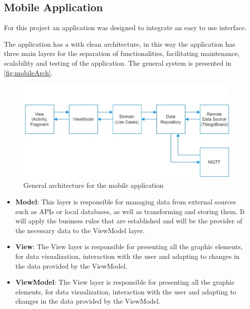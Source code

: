 \clearpage
\subsection{Mobile Application}

For this project an application was designed to integrate an easy to use interface.

The application has a  with clean architecture, in this way the application has three main layers for the separation of functionalities, facilitating maintenance, scalability and testing of the application. The general system is presented in \autoref{fig:mobileArch}.

\begin{figure}[H]
    \centering
    \includegraphics[width=1\textwidth]{./images/8/Diagrama.jpg}
    \caption{General architecture for the mobile application}
    \label{fig:mobileArch}
\end{figure}

\begin{itemize}
    \item \textbf{Model}: This layer is responsible for managing data from external sources such as APIs or local databases, as well as transforming and storing them. It will apply the business rules that are established and will be the provider of the necessary data to the ViewModel layer.
    \item \textbf{View}: The View layer is responsible for presenting all the graphic elements, for data visualization, interaction with the user and adapting to changes in the data provided by the ViewModel. 
    \item \textbf{ViewModel}: The View layer is responsible for presenting all the graphic elements, for data visualization, interaction with the user and adapting to changes in the data provided by the ViewModel. 
\end{itemize}

